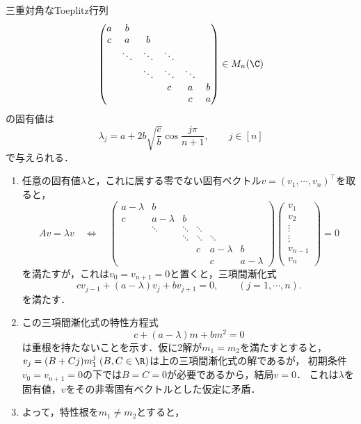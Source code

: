 \documentclass[uplatex, dvipdfmx]{jsreport}
\begin{document}
\begin{theorem}
    三重対角なToeplitz行列
    \[\begin{pmatrix}
        a&b\\
        c&a&b\\
        &\ddots&\ddots&\ddots\\
        &&\ddots&\ddots&\ddots\\
        &&&c&a&b\\
        &&&&c&a
    \end{pmatrix}\in M_n(\C)\]
    の固有値は
    \[\lambda_j=a+2b\sqrt{\frac{c}{b}}\cos\frac{j\pi}{n+1},\qquad j\in[n]\]
    で与えられる．
\end{theorem}
\begin{Proof}\mbox{}
    \begin{enumerate}[{Step}1]
        \item 任意の固有値$\lambda$と，これに属する零でない固有ベクトル$v=(v_1,\cdots,v_n)^\top$を取ると，
        \[Av=\lambda v\quad\Leftrightarrow\quad 
        \begin{pmatrix}
            a-\lambda&b\\
            c&a-\lambda&b\\
            &\ddots&\ddots&\ddots\\
            &&\ddots&\ddots&\ddots\\
            &&&c&a-\lambda&b\\
            &&&&c&a-\lambda
        \end{pmatrix}\begin{pmatrix}v_1\\v_2\\\vdots\\\vdots\\v_{n-1}\\v_n\end{pmatrix}=0\]
        を満たすが，これは$v_0=v_{n+1}=0$と置くと，三項間漸化式
        \[cv_{j-1}+(a-\lambda)v_j+bv_{j+1}=0,\qquad(j=1,\cdots,n).\]
        を満たす．
        \item この三項間漸化式の特性方程式
        \[c+(a-\lambda)m+bm^2=0\]
        は重根を持たないことを示す．仮に2解が$m_1=m_2$を満たすとすると，
        $v_j=(B+Cj)m_1^j\;(B,C\in\R)$は上の三項間漸化式の解であるが，
        初期条件$v_0=v_{n+1}=0$の下では$B=C=0$が必要であるから，結局$v=0$．
        これは$\lambda$を固有値，$v$をその非零固有ベクトルとした仮定に矛盾．
        \item よって，特性根を$m_1\ne m_2$とすると，

\end{enumerate}
\end{Proof}
\end{document}
